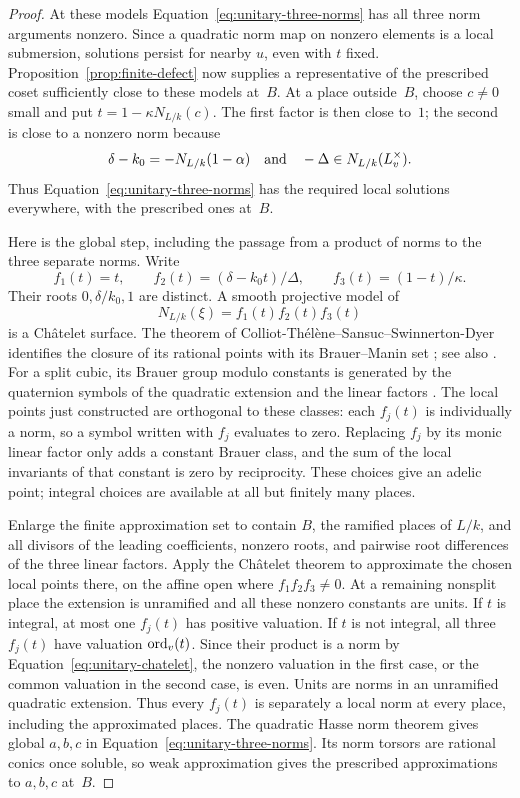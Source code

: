 \begin{proof}
At these models Equation~\eqref{eq:unitary-three-norms} has all three
norm arguments nonzero.  Since a quadratic norm map on nonzero
elements is a local submersion, solutions persist for nearby $u$, even
with $t$ fixed.  Proposition~\ref{prop:finite-defect} now supplies a
representative of the prescribed coset sufficiently close to these
models at~$B$.  At a place outside~$B$, choose $c\ne0$ small and put
$t=1-\kappa N_{L/k}(c)$.  The first factor is then close to~$1$; the
second is close to a nonzero norm because
\[
 \delta-k_0=-N_{L/k}(1-\alpha)
 \quad\hbox{and}\quad -\Delta\in N_{L/k}(L_v^\times).
\]
Thus Equation~\eqref{eq:unitary-three-norms} has the required local
solutions everywhere, with the prescribed ones at~$B$.

Here is the global step, including the passage from a product of
norms to the three separate norms.  Write
\[
 f_1(t)=t,\qquad f_2(t)=(\delta-k_0t)/\Delta,\qquad
 f_3(t)=(1-t)/\kappa.
\]
Their roots $0,\delta/k_0,1$ are distinct.  A smooth projective model
of
\begin{equation}\label{eq:unitary-chatelet}
 N_{L/k}(\xi)=f_1(t)f_2(t)f_3(t)
\end{equation}
is a Ch\^atelet surface.  The theorem of
Colliot-Th\'el\`ene--Sansuc--Swinnerton-Dyer identifies the closure of
its rational points with its Brauer--Manin set
\cite{CTSansucSD}; see also \cite[Section~5.2]{CT1992}.
For a split cubic, its
Brauer group modulo constants is generated by the quaternion symbols
of the quadratic extension and the linear factors
\cite{CTSansucSD}.  The local points just constructed are orthogonal
to these classes: each $f_j(t)$ is individually a norm, so a symbol
written with $f_j$ evaluates to zero.  Replacing $f_j$ by its monic
linear factor only adds a constant Brauer class, and the sum of the
local invariants of that constant is zero by reciprocity.  These
choices give an adelic point; integral choices are available at all
but finitely many places.

Enlarge the finite approximation set to contain $B$, the ramified
places of $L/k$, and all divisors of the leading coefficients, nonzero
roots, and pairwise root differences of the three linear factors.  Apply the
Ch\^atelet theorem to approximate the chosen local points there, on
the affine open where $f_1f_2f_3\ne0$.  At a remaining nonsplit place
the extension is unramified and all these nonzero constants are units.  If
$t$ is integral, at most one $f_j(t)$ has positive valuation.  If $t$
is not integral, all three $f_j(t)$ have valuation $\operatorname{ord}_v(t)$.  Since
their product is a norm by Equation~\eqref{eq:unitary-chatelet}, the
nonzero valuation in the first case, or the common valuation in the
second case, is even.  Units are norms in an unramified quadratic
extension.  Thus every $f_j(t)$ is separately a local norm at every
place, including the approximated places.  The quadratic Hasse norm
theorem \cite[Chapter~VIII, Theorem~3.1]{MilneCFT} gives global $a,b,c$ in
Equation~\eqref{eq:unitary-three-norms}.  Its norm torsors are rational
conics once soluble, so weak approximation gives the prescribed
approximations to $a,b,c$ at~$B$.


\end{proof}
